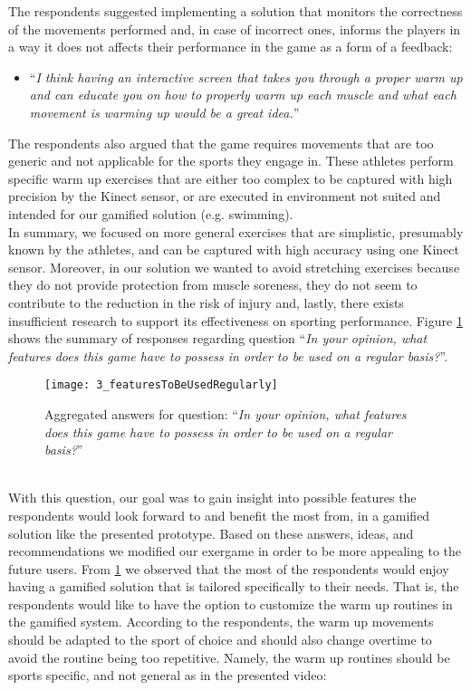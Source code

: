 The respondents suggested implementing a solution that monitors the correctness of the movements performed and, in case of incorrect ones, informs the players in a way it does not affects their performance in the game as a form of a feedback:
\begin{itemize}
\item ``\textit{I think having an interactive screen that takes you through a proper warm up and can educate you on how to properly warm up each muscle and what each movement is warming up would be a great idea.}''
\end{itemize}
The respondents also argued that the game requires movements that are too generic and not applicable for the sports they engage in. These athletes perform specific warm up exercises that are either too complex to be captured with high precision by the Kinect sensor, or are executed in environment not suited and intended for our gamified solution (e.g. swimming). \\In summary, we focused on more general exercises that are simplistic, presumably known by the athletes, and can be captured with high accuracy using one Kinect sensor. Moreover, in our solution we wanted to avoid stretching exercises because they do not provide protection from muscle soreness, they do not seem to contribute to the reduction in the risk of injury and, lastly, there exists insufficient research to support its effectiveness on sporting performance.  Figure \ref{fig:3_featuresToBeUsedRegularly} shows the summary of responses regarding question ``\textit{In your opinion, what features does this game have to possess in order to be used on a regular basis?}''.\\
\begin{figure}[h]
    \centering
    \texttt{[image: 3\_featuresToBeUsedRegularly]}
    \caption[Results for required features of the exergame.]{Aggregated answers for question: ``\textit{In your opinion, what features does this game have to possess in order to be used on a regular basis?}''}
    \label{fig:3_featuresToBeUsedRegularly}
\end{figure}\\
With this question, our goal was to gain insight into possible features the respondents would look forward to and benefit the most from, in a gamified solution like the presented prototype. Based on these answers, ideas, and recommendations we modified our exergame in order to be more appealing to the future users. From \ref{fig:3_featuresToBeUsedRegularly} we observed that the most of the respondents would enjoy having a gamified solution that is tailored specifically to their needs. That is, the respondents would like to have the option to customize the warm up routines in the gamified system. According to the respondents, the warm up movements should be adapted to the sport of choice and should also change overtime to avoid the routine being too repetitive. Namely, the warm up routines should be sports specific, and not general as in the presented video:
